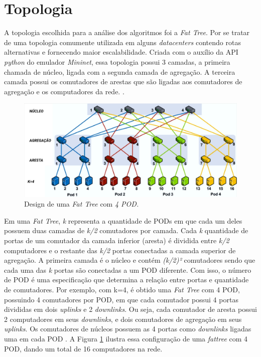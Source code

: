 \section{Topologia}
\label{sec:topologia}
A topologia escolhida para a análise dos algoritmos foi a \emph{Fat Tree}. Por se tratar de uma topologia comumente utilizada em alguns \emph{datacenters} contendo rotas alternativas e fornecendo maior escalabilidade. Criada com o auxílio da API \emph{python} do emulador \emph{Mininet}, essa topologia possui 3 camadas, a primeira chamada de núcleo, ligada com a segunda camada de agregação. A terceira camada possui os comutadores de arestas que são ligadas aos comutadores de agregação e os computadores da rede. \cite{alqahtani2018rethinking}. 
\begin{figure}[!htb]
	\caption{\label{fig:fattree}Design de uma \emph{Fat Tree} com \emph{4 POD.}}
	\begin{center}
	    \includegraphics[scale=0.45]{imagens/fattree.jpg}
	\end{center}
\end{figure}

Em uma \emph{Fat Tree}, \textit{k} representa a quantidade de PODs em que cada um deles possuem duas camadas de \textit{k/2} comutadores por camada. Cada \textit{k} quantidade de portas de um comutador da camada inferior (aresta) é dividida entre \textit{k/2} computadores e o restante das \textit{k/2} portas conectadas a camada superior de agregação. A primeira camada é o núcleo e  contém \textit{(k/2)²} comutadores sendo que cada uma das \textit{k} portas são conectadas a um POD diferente. Com isso, o número de POD é uma especificação que determina a relação entre portas e quantidade de comutadores. Por exemplo, com k=4, é obtido uma \emph{Fat Tree} com 4 POD, possuindo 4 comutadores por POD, em que cada comutador possui 4 portas divididas em dois \emph{uplinks} e 2 \emph{downlinks}. Ou seja, cada comutador de aresta possui 2 computadores em seus \emph{downlinks}, e dois comutadores de agregação em seus \emph{uplinks}. Os comutadores de núcleos possuem as 4 portas como \emph{downlinks} ligadas uma em cada POD \cite{al2008scalable}. A Figura \ref{fig:fattree} ilustra essa configuração de uma \emph{fattree} com 4 POD, dando um total de 16 computadores na rede. 

